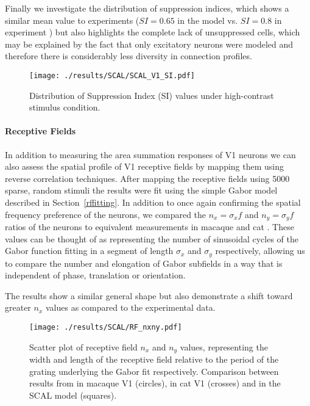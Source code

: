 Finally we investigate the distribution of suppression indices, which
shows a similar mean value to experiments ($SI=0.65$ in the model
vs. $SI=0.8$ in experiment \citep{Sceniak2006}) but also highlights
the complete lack of unsuppressed cells, which may be explained by the
fact that only excitatory neurons were modeled and therefore there is
considerably less diversity in connection profiles.

\begin{figure}
	\centering
        \texttt{[image: ./results/SCAL/SCAL\_V1\_SI.pdf]}
	\caption{Distribution of Suppression Index (SI) values under
      high-contrast stimulus condition.}
	\label{SCALSI}
\end{figure}


\paragraph{Receptive Fields}

In addition to measuring the area summation responses of V1 neurons we
can also assess the spatial profile of V1 receptive fields by mapping
them using reverse correlation techniques. After mapping the receptive
fields using 5000 sparse, random stimuli the results were fit using
the simple Gabor model described in Section~\ref{rffitting}. In
addition to once again confirming the spatial frequency preference of
the neurons, we compared the $n_x=\sigma_x f$ and $n_y=\sigma_y f$
ratios of the neurons to equivalent measurements in macaque
\citep{Ringach2002b} and cat \citep{Jones1987}. These values can be
thought of as representing the number of sinusoidal cycles of the
Gabor function fitting in a segment of length $\sigma_x$ and
$\sigma_y$ respectively, allowing us to compare the number and
elongation of Gabor subfields in a way that is independent of phase,
translation or orientation.

The results show a similar general shape but also demonstrate a shift
toward greater $n_x$ values as compared to the experimental data.

\begin{figure}
	\centering
        \texttt{[image: ./results/SCAL/RF\_nxny.pdf]}
	\caption[Relative elongation and width of V1 receptive fields. A
      comparison between SCAL, cat V1 \cite{Jones1987} and macaque V1
      \cite{Ringach2002b}.]{Scatter plot of receptive field $n_x$ and
      $n_y$ values, representing the width and length of the receptive
      field relative to the period of the grating underlying the Gabor
      fit respectively. Comparison between results from
      \cite{Ringach2002b} in macaque V1 (circles), \cite{Jones1987} in
      cat V1 (crosses) and in the SCAL model (squares).}
	\label{RFFits}
\end{figure}

